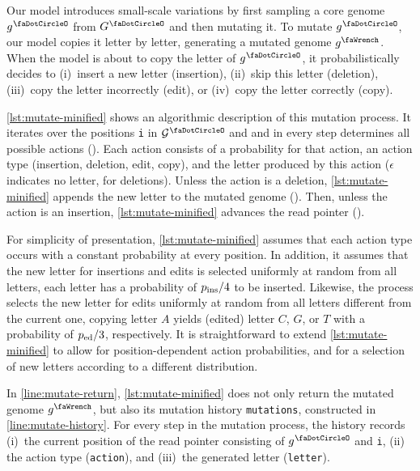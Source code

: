 Our model introduces small-scale variations by first sampling a core genome $\genome^\gcore$ from $\genomeRV^\gcore$ and then mutating it.
To mutate $\genome^\gcore$, our model copies it letter by letter, generating a mutated genome $\genome^\gmut$.
When the model is about to copy the  letter of $\genome^\gcore$, it probabilistically decides to (i)~insert a new letter (insertion), (ii)~skip this letter (deletion), (iii)~copy the letter incorrectly (edit), or (iv)~copy the letter correctly (copy).

\begin{figure}
	
\end{figure}

\cref{lst:mutate-minified} shows an algorithmic description of this mutation process.
It iterates over the positions \texttt{i} in $\genomes^\gcore$ and and in every step determines all possible actions ().
Each action consists of a probability for that action, an action type (insertion, deletion, edit, copy), and the letter produced by this action ($\epsilon$ indicates no letter, for deletions).
Unless the action is a deletion, \cref{lst:mutate-minified} appends the new letter to the mutated genome ().
Then, unless the action is an insertion, \cref{lst:mutate-minified} advances the read pointer ().

For simplicity of presentation, \cref{lst:mutate-minified} assumes that each action type occurs with a constant probability at every position. 
In addition, it assumes that the new letter for insertions and edits is selected uniformly at random from all letters, \ie each letter has a probability of $p_\text{ins}/4$ to be inserted.
Likewise, the process selects the new letter for edits uniformly at random from all letters different from the current one, \eg copying letter $A$ yields (edited) letter $C$, $G$, or $T$ with a probability of $p_\text{ed}/3$, respectively.
It is straightforward to extend \cref{lst:mutate-minified} to allow for position-dependent action probabilities, and for a selection of new letters according to a different distribution.

In \cref{line:mutate-return}, \cref{lst:mutate-minified} does not only return the mutated genome $\genome^\gmut$, but also its mutation history \texttt{mutations}, constructed in \cref{line:mutate-history}.
For every step in the mutation process, the history records (i)~the current position of the read pointer consisting of $\genome^\gcore$ and \texttt{i}, (ii) the action type (\texttt{action}), and (iii)~the generated letter (\texttt{letter}).

